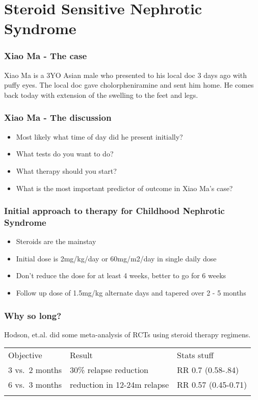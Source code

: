 \section{Steroid Sensitive Nephrotic Syndrome}

\begin{frame}\frametitle{Xiao Ma - The case}

Xiao Ma is a 3YO Asian male who presented to his local doc 3 days ago
with puffy eyes. The local doc gave cholorpheniramine and sent him home.
He comes back today with extension of the swelling to the feet and legs.

\end{frame}

\begin{frame}\frametitle{Xiao Ma - The discussion}

\begin{itemize}[<+->]
\itemsep1pt\parskip0pt
\item
  Most likely what time of day did he present initially?
\item
  What tests do you want to do?
\item
  What therapy should you start?
\item
  What is the most important predictor of outcome in Xiao Ma's case?
\end{itemize}

\end{frame}

\begin{frame}\frametitle{Initial approach to therapy for Childhood
Nephrotic Syndrome}

\begin{itemize}[<+->]
\itemsep1pt\parskip0pt
\item
  Steroids are the mainstay
\item
  Initial dose is 2mg/kg/day or 60mg/m2/day in single daily dose
\item
  Don't reduce the dose for at least 4 weeks, better to go for 6 weeks
\item
  Follow up dose of 1.5mg/kg alternate days and tapered over 2 - 5
  months
\end{itemize}

\end{frame}

\begin{frame}\frametitle{Why so long?}

Hodson, et.al. did some meta-analysis of RCTs using steroid therapy
regimens.

\begin{longtable}[c]{@{}lll@{}}
\hline\noalign{\medskip}
Objective & Result & Stats stuff
\\\noalign{\medskip}
\hline\noalign{\medskip}
3 vs.~2 months & 30\% relapse reduction & RR 0.7 (0.58-.84)
\\\noalign{\medskip}
6 vs.~3 months & reduction in 12-24m relapse & RR 0.57 (0.45-0.71)
\\\noalign{\medskip}
\hline
\end{longtable}

\end{frame}

